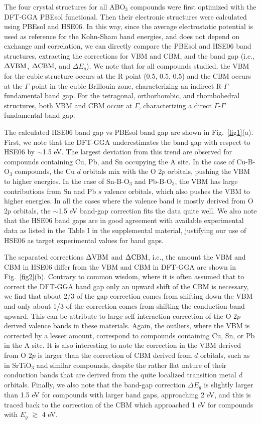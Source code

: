 \documentclass[%
reprint,
superscriptaddress,
citeautoscript,
 amsmath,amssymb,
 aps,
 prl,
floatfix,
]{revtex4-1}
\begin{document}
The four crystal structures for all ABO$_{3}$ compounds were first optimized with the DFT-GGA PBEsol functional. Then their electronic structures were calculated using PBEsol and HSE06. In this way, since the average electrostatic potential is used as reference for the Kohn-Sham band energies, and does not depend on exchange and correlation, we can directly compare the PBEsol and HSE06 band structures, extracting the corrections for VBM and CBM, and the band gap (i.e., $\Delta {\rm VBM}$, $\Delta {\rm CBM}$, and $\Delta E_{g}$).  We note that for all compounds studied, the VBM for the cubic structure occurs at the R point (0.5, 0.5, 0.5) and the CBM occurs at the $\Gamma$ point in the cubic Brillouin zone, characterizing an indirect R-$\Gamma$ fundamental band gap.  For the tetragonal, orthorhombic, and rhombohedral structures, both VBM and CBM occur at $\Gamma$, characterizing a direct $\Gamma$-$\Gamma$ fundamental band gap. 

The calculated HSE06 band gap vs PBEsol band gap are shown in Fig.~\ref{fig1}(a). First, we note that the DFT-GGA underestimates the band gap with respect to HSE06 by $\sim$1.5 eV. The largest deviation from this trend are observed for compounds containing Cu, Pb, and Sn occupying the A site. In the case of Cu-B-O$_3$ compounds, the Cu $d$ orbitals mix with the O 2$p$ orbitals, pushing the VBM to higher energies. In the case of Sn-B-O$_3$ and Pb-B-O$_3$, the VBM has large contributions from Sn and Pb $s$ valence orbitals, which also pushes the VBM to higher energies. In all the cases where the valence band is mostly derived from O 2$p$ orbitals, the $\sim$1.5 eV band-gap correction fits the data quite well.  
We also note that the HSE06 band gaps are in good agreement with available experimental data as listed in the Table I in the supplemental material, justifying our use of HSE06 as target experimental values for band gaps.

The separated corrections $\Delta {\rm VBM}$ and $\Delta {\rm CBM}$, i.e., the amount the VBM and CBM in HSE06 differ from the VBM and CBM in DFT-GGA are shown in Fig.~\ref{fig2}(b). Contrary to common wisdom, where it is often assumed that to correct the DFT-GGA band gap only an upward shift of the CBM is necessary, we find that about 2/3 of the gap correction comes from shifting down the VBM and only about 1/3 of the correction comes from shifting the conduction band upward. This can be attribute to large self-interaction correction of the O 2$p$ derived valence bands in these materials.  Again, the outliers, where the VBM is corrected by a lesser amount, correspond to compounds containing Cu, Sn, or Pb in the A site. It is also interesting to note the correction in the VBM derived from O 2$p$ is larger than the correction of CBM derived from $d$ orbitals, such as in SrTiO$_3$ and similar compounds, despite the rather flat nature of their conduction bands that are derived from the quite localized transition metal $d$ orbitals. Finally, we also note that the band-gap correction $\Delta E_{g}$ is slightly larger than 1.5 eV for compounds with larger band gaps, approaching 2 eV, and this is traced back to the correction of the CBM which approached 1 eV for compounds with $E_g$ $\gtrsim$ 4 eV.
\end{document}
